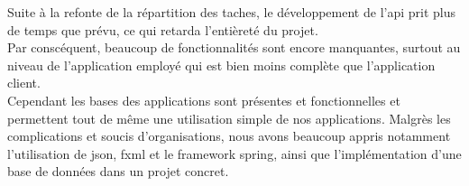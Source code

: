 \documentclass[../rapport.tex]{subfiles}
\begin{document}
Suite à la refonte de la répartition des taches, le développement de l'api prit plus de temps que prévu, ce qui retarda l'entièreté du projet.\\
Par conscéquent, beaucoup de fonctionnalités sont encore manquantes, surtout au niveau de l'application employé qui est bien moins complète que l'application client.\\
Cependant les bases des applications sont présentes et fonctionnelles et permettent tout de même une utilisation simple de nos applications. 
Malgrès les complications et soucis d'organisations, nous avons beaucoup appris notamment l'utilisation de json, fxml et le framework spring, ainsi que l'implémentation d'une base de données dans un projet concret.

\newpage
\end{document}
